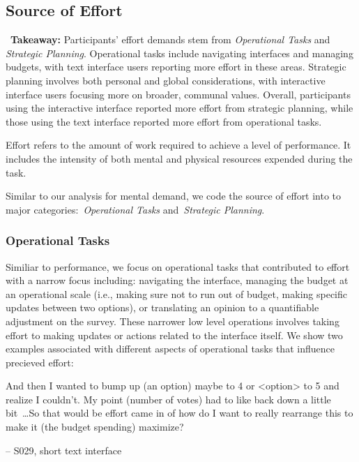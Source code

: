 \subsection{Source of Effort}
\label{sec:effort}

\vspace{5pt}
\begin{tldrbox}
    \faInfoCircle~\xspace\textbf{Takeaway:} Participants' effort demands stem from \textit{Operational Tasks} and \textit{Strategic Planning}. Operational tasks include navigating interfaces and managing budgets, with text interface users reporting more effort in these areas. Strategic planning involves both personal and global considerations, with interactive interface users focusing more on broader, communal values. Overall, participants using the interactive interface reported more effort from strategic planning, while those using the text interface reported more effort from operational tasks.
\end{tldrbox}
Effort refers to the amount of work required to achieve a level of performance. It includes the intensity of both mental and physical resources expended during the task.

Similar to our analysis for mental demand, we code the source of effort into to major categories:~\textit{Operational Tasks} and~\textit{Strategic Planning}.

\subsubsection{Operational Tasks} Similiar to performance, we focus on operational tasks that contributed to effort with a narrow focus including: navigating the interface, managing the budget at an operational scale (i.e., making sure not to run out of budget, making specific updates between two options), or translating an opinion to a quantifiable adjustment on the survey. These narrower low level operations involves taking effort to making updates or actions related to the interface itself. We show two examples associated with different aspects of operational tasks that influence precieved effort:

\begin{displayquote}
And then I wanted to bump up (an option) maybe to 4 or <option> to 5 and realize I couldn't. My point (number of votes) had to like back down a little bit~\ldots So that would be effort came in of how do I want to really rearrange this to make it (the budget spending) maximize?

\noindent \hfill -- S029, short text interface
\end{displayquote}

